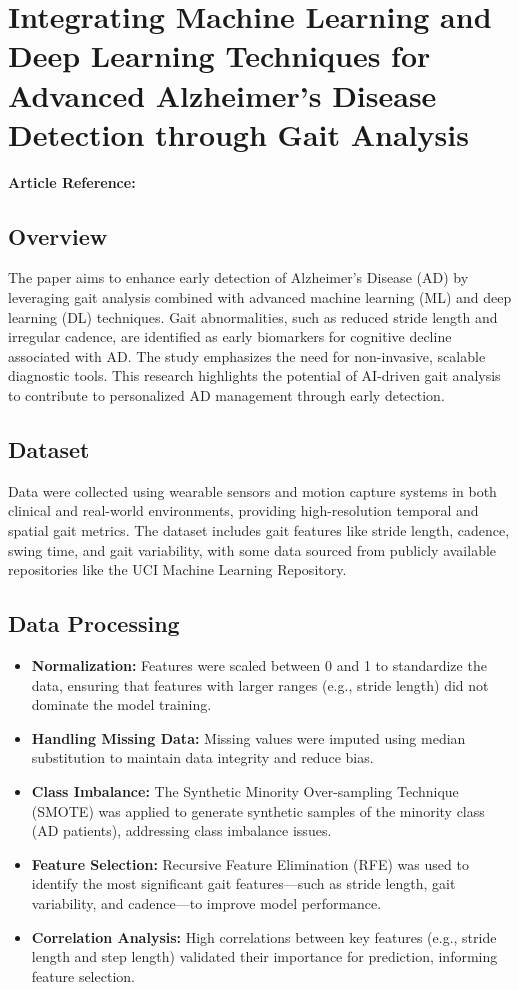 \section{Integrating Machine Learning and Deep Learning Techniques for Advanced Alzheimer's Disease Detection through Gait Analysis}
\textbf{Article Reference:} \cite{sarkarIntegratingMachineLearning2025}

\subsection*{Overview}
The paper aims to enhance early detection of Alzheimer's Disease (AD) by leveraging gait analysis combined with advanced machine learning (ML) and deep learning (DL) techniques. Gait abnormalities, such as reduced stride length and irregular cadence, are identified as early biomarkers for cognitive decline associated with AD. The study emphasizes the need for non-invasive, scalable diagnostic tools. This research highlights the potential of AI-driven gait analysis to contribute to personalized AD management through early detection.

\subsection*{Dataset}
Data were collected using wearable sensors and motion capture systems in both clinical and real-world environments, providing high-resolution temporal and spatial gait metrics. The dataset includes gait features like stride length, cadence, swing time, and gait variability, with some data sourced from publicly available repositories like the UCI Machine Learning Repository.

\subsection*{Data Processing}
\begin{itemize}
    \item \textbf{Normalization:} Features were scaled between 0 and 1 to standardize the data, ensuring that features with larger ranges (e.g., stride length) did not dominate the model training.
    \item \textbf{Handling Missing Data:} Missing values were imputed using median substitution to maintain data integrity and reduce bias.
    \item \textbf{Class Imbalance:} The Synthetic Minority Over-sampling Technique (SMOTE) was applied to generate synthetic samples of the minority class (AD patients), addressing class imbalance issues.
    \item \textbf{Feature Selection:} Recursive Feature Elimination (RFE) was used to identify the most significant gait features—such as stride length, gait variability, and cadence—to improve model performance.
    \item \textbf{Correlation Analysis:} High correlations between key features (e.g., stride length and step length) validated their importance for prediction, informing feature selection.
\end{itemize}

